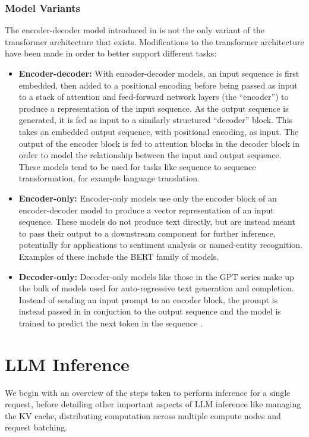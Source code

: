 \documentclass[11pt,twoside]{report}
\begin{document}
\subsubsection{Model Variants}
The encoder-decoder model introduced in \cite{vaswani2017attention} is not the only variant of the transformer architecture that exists.
Modifications to the transformer architecture have been made in order to better support different tasks:  
\begin{itemize}
  \item \textbf{Encoder-decoder:}
    With encoder-decoder models, an input sequence is first embedded, then added to a positional encoding before being passed as input to a stack of attention and feed-forward network layers (the ``encoder'') to produce a representation of the input sequence. 
    As the output sequence is generated, it is fed as input to a similarly structured ``decoder'' block. 
    This takes an embedded output sequence, with positional encoding, as input.
    The output of the encoder block is fed to attention blocks in the decoder block in order to model the relationship between the input and output sequence.
    These models \cite{raffel2020exploring} tend to be used for tasks like sequence to sequence transformation, for example language translation.
  \item \textbf{Encoder-only:}
    Encoder-only models use only the encoder block of an encoder-decoder model to produce a vector representation of an input sequence.
    These models do not produce text directly, but are instead meant to pass their output to a downstream component for further inference, potentially for applications to sentiment analysis or named-entity recognition.
    Examples of these include the BERT \cite{kenton2019bert} family of models.
  \item \textbf{Decoder-only:}
    Decoder-only models like those in the GPT \cite{radford2018improving} series make up the bulk of models used for auto-regressive text generation and completion. 
    Instead of sending an input prompt to an encoder block, the prompt is instead passed in in conjuction to the output sequence and the model is trained to predict the next token in the sequence \cite{dai2015semi}.
\end{itemize}

\section{LLM Inference}\label{section:llminference}
We begin with an overview of the steps taken to perform inference for a single request, before detailing other important aspects of LLM inference like managing the KV cache, distributing computation across multiple compute nodes and request batching.
\end{document}

